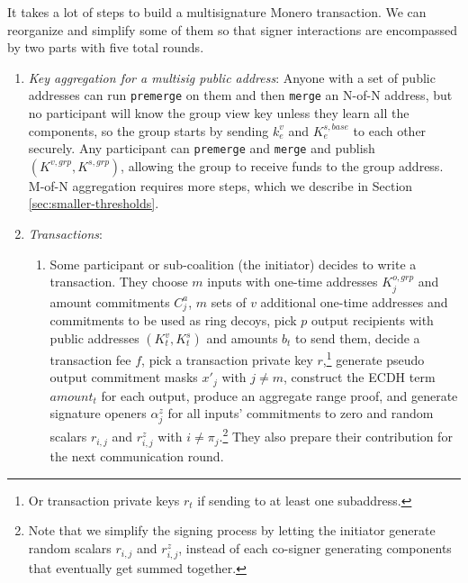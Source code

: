 It takes a lot of steps to build a multisignature Monero transaction. We can reorganize and simplify some of them so that signer interactions are encompassed by two parts with five total rounds.
\begin{enumerate}
    \item {\it Key aggregation for a multisig public address}: Anyone with a set of public addresses can run {\tt premerge} on them and then {\tt merge} an N-of-N address, but no participant will know the group view key unless they learn all the components, so the group starts by sending $k^{v}_e$ and $K^{s,base}_e$ to each other securely. Any participant can {\tt premerge} and {\tt merge} and publish $(K^{v,grp},K^{s,grp})$, allowing the group to receive funds to the group address. M-of-N aggregation requires more steps, which we describe in Section \ref{sec:smaller-thresholds}.
    \item {\it Transactions}:
    \begin{enumerate}
        \item Some participant or sub-coalition (the initiator) decides to write a transaction. They choose $m$ inputs with one-time addresses $K^{o,grp}_{j}$ and amount commitments $C^a_j$, $m$ sets of $v$ additional one-time addresses and commitments to be used as ring decoys, pick $p$ output recipients with public addresses $(K^v_t,K^s_t)$ and amounts $b_t$ to send them, decide a transaction fee $f$, pick a transaction private key $r$,\footnote{Or transaction private keys $r_{t}$ if sending to at least one subaddress.} generate pseudo output commitment masks $x'_{j}$ with $j \neq m$, construct the ECDH term $\mathit{amount}_t$ for each output, produce an aggregate range proof, and generate signature openers $\alpha^z_j$ for all inputs' commitments to zero and random scalars $r_{i,j}$ and $r^z_{i,j}$ with $i \neq \pi_j$.\footnote{Note that we simplify the signing process by letting the initiator generate random scalars $r_{i,j}$ and $r^z_{i,j}$, instead of each co-signer generating components that eventually get summed together.} They also prepare their contribution for the next communication round.\\


\end{enumerate}
\end{enumerate}
